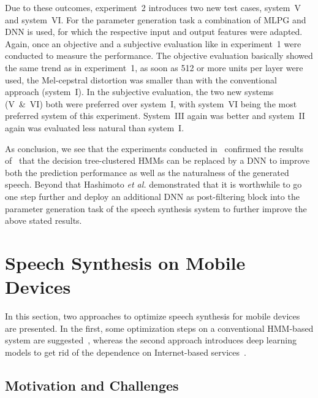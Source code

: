 Due to these outcomes, experiment~2 introduces two new test cases, system~V and system~VI. For the parameter generation task a combination of \ac{MLPG} and \ac{DNN} is used, for which the respective input and output features were adapted. Again, once an objective and a subjective evaluation like in experiment~1 were conducted to measure the performance. The objective evaluation basically showed the same trend as in experiment~1, as soon as 512 or more units per layer were used, the Mel-cepstral distortion was smaller than with the conventional approach (system~I). In the subjective evaluation, the two new systems (V~\&~VI) both were preferred over system~I, with system~VI being the most preferred system of this experiment. System~III again was better and system~II again was evaluated less natural than system~I.

As conclusion, we see that the experiments conducted in~\cite{hashimoto:effect} confirmed the results of~\cite{zen:deepstatistical} that the decision tree-clustered \acp{HMM} can be replaced by a \ac{DNN} to improve both the prediction performance as well as the naturalness of the generated speech. Beyond that Hashimoto \textit{et al.} demonstrated that it is worthwhile to go one step further and deploy an additional \ac{DNN} as post-filtering block into the parameter generation task of the speech synthesis system to further improve the above stated results.


\section{Speech Synthesis on Mobile Devices}
\label{sec:embeddedspeech}

In this section, two approaches to optimize speech synthesis for mobile devices are presented. In the first, some optimization steps on a conventional \ac{HMM}-based system are suggested~\cite{toth:optimizing}, whereas the second approach introduces deep learning models to get rid of the dependence on Internet-based services~\cite{boros:robust}.

\subsection{Motivation and Challenges}
\label{subsec:motembedded}

